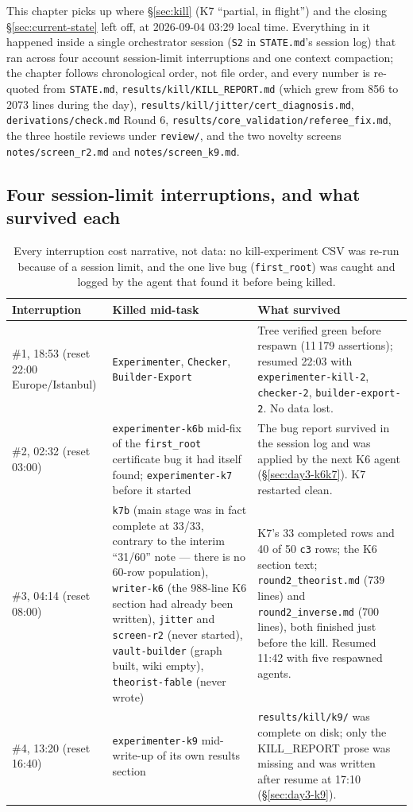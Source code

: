 \documentclass[10pt,a4paper]{article}
\newcommand{\fn}[1]{\nolinkurl{#1}}
\begin{document}
This chapter picks up where \S\ref{sec:kill} (K7 ``partial, in flight'') and the closing
\S\ref{sec:current-state} left off, at 2026-09-04 03:29 local time. Everything in it happened
inside a single orchestrator session (\texttt{S2} in \fn{STATE.md}'s session log) that ran
across four account session-limit interruptions and one context compaction; the chapter
follows chronological order, not file order, and every number is re-quoted from
\fn{STATE.md}, \fn{results/kill/KILL\_REPORT.md} (which grew from 856 to 2073 lines during the
day), \fn{results/kill/jitter/cert\_diagnosis.md}, \fn{derivations/check.md} Round 6,
\fn{results/core\_validation/referee\_fix.md}, the three hostile reviews under \fn{review/}, and
the two novelty screens \fn{notes/screen\_r2.md} and \fn{notes/screen\_k9.md}.

\subsection{Four session-limit interruptions, and what survived each}

\begin{table}[h]\centering\small
\begin{tabular}{@{}p{20mm}p{62mm}p{62mm}@{}}
\toprule
Interruption & Killed mid-task & What survived \\
\midrule
\#1, 18:53 (reset 22:00 Europe/Istanbul) & \texttt{Experimenter}, \texttt{Checker},
\texttt{Builder-Export} & Tree verified green before respawn (11\,179 assertions); resumed 22:03
with \texttt{experimenter-kill-2}, \texttt{checker-2}, \texttt{builder-export-2}. No data lost. \\
\#2, 02:32 (reset 03:00) & \texttt{experimenter-k6b} mid-fix of the \fn{first\_root} certificate
bug it had itself found; \texttt{experimenter-k7} before it started & The bug report survived in
the session log and was applied by the next K6 agent (\S\ref{sec:day3-k6k7}). K7 restarted clean. \\
\#3, 04:14 (reset 08:00) & \texttt{k7b} (main stage was in fact complete at 33/33, contrary to
the interim ``31/60'' note --- there is no 60-row population), \texttt{writer-k6} (the 988-line
K6 section had already been written), \texttt{jitter} and \texttt{screen-r2} (never started),
\texttt{vault-builder} (graph built, wiki empty), \texttt{theorist-fable} (never wrote) & K7's 33
completed rows and 40 of 50 \texttt{c3} rows; the K6 section text; \fn{round2\_theorist.md} (739
lines) and \fn{round2\_inverse.md} (700 lines), both finished just before the kill. Resumed 11:42
with five respawned agents. \\
\#4, 13:20 (reset 16:40) & \texttt{experimenter-k9} mid-write-up of its own results section &
\fn{results/kill/k9/} was complete on disk; only the KILL\_REPORT prose was missing and was
written after resume at 17:10 (\S\ref{sec:day3-k9}). \\
\bottomrule
\end{tabular}
\caption{Every interruption cost narrative, not data: no kill-experiment CSV was re-run because
of a session limit, and the one live bug (\fn{first\_root}) was caught and logged by the agent
that found it before being killed.}
\end{table}
\end{document}
